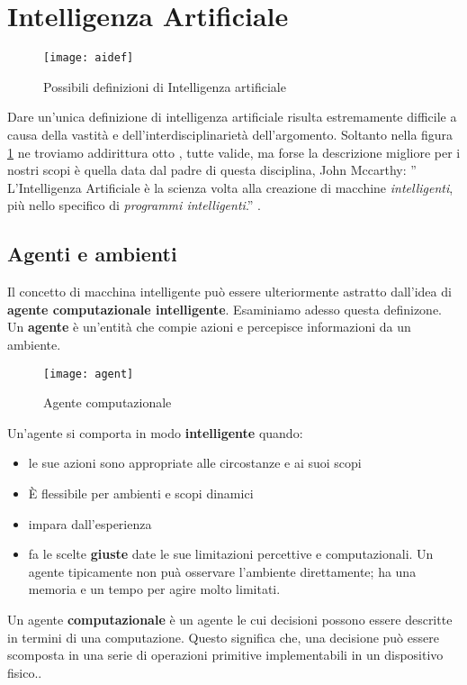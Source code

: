\section{Intelligenza Artificiale}

\begin{figure}
    \texttt{[image: aidef]}
    \caption{Possibili definizioni di Intelligenza artificiale\cite{aima}}
    \label{fig:ai}
  \end{figure}
Dare un'unica definizione di intelligenza artificiale risulta estremamente difficile a causa della vastità
e dell'interdisciplinarietà dell'argomento. Soltanto nella figura \ref{fig:ai} ne  troviamo addirittura otto , tutte valide, ma forse
la descrizione  migliore per i nostri scopi  è quella data dal padre di questa disciplina, John Mccarthy:
'' L'Intelligenza Artificiale è la scienza volta alla creazione di macchine  \emph{intelligenti},
più nello specifico di \emph{programmi intelligenti}.'' \cite{ai}.
\subsection{Agenti e ambienti}
Il concetto di macchina intelligente può essere ulteriormente
astratto dall'idea di \textbf{agente computazionale intelligente}. Esaminiamo adesso questa definizone.
Un \textbf{agente} è un'entità che compie azioni
e percepisce informazioni da un ambiente.

\begin{figure}
  \centering
  \texttt{[image: agent]}
  \caption{Agente computazionale\cite{aima}}
  \label{fig:agente}
\end{figure}

Un'agente si comporta in modo \textbf{intelligente} quando:
\begin{itemize}
  \item le sue azioni sono appropriate alle circostanze e ai suoi scopi
  \item È flessibile per ambienti e scopi dinamici
  \item impara dall'esperienza
  \item fa le scelte \textbf{giuste} date le sue limitazioni percettive e computazionali. Un agente tipicamente
  non puà osservare l'ambiente direttamente; ha una memoria e un tempo per agire molto limitati.
\end{itemize}
 Un agente \textbf{computazionale} è un agente le cui decisioni possono essere descritte in termini di una
 computazione. Questo significa che, una decisione può essere scomposta in una serie di operazioni primitive
 implementabili in un dispositivo fisico.\cite{PooleMackworth17}.
